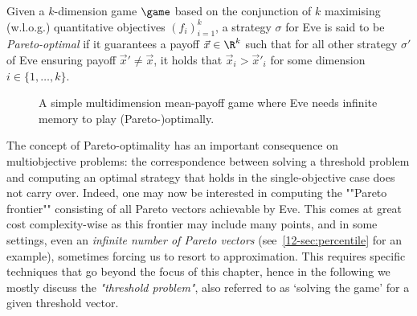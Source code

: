 \begin{definition}
Given a $k$-dimension game $\game$ based on the conjunction of $k$ maximising (w.l.o.g.) quantitative objectives $(f_i)_{i=1}^{k}$, a strategy $\sigma$ for Eve is said to be \emph{Pareto-optimal} if it guarantees a payoff $\vec{x} \in \R^k$ such that for all other strategy $\sigma'$ of Eve ensuring payoff $\vec{x}' \neq \vec{x}$, it holds that $\vec{x}_i > \vec{x}'_i$ for some dimension $i \in \{1, \ldots, k\}$.
\end{definition}
 
  
\begin{figure}[tbp]
  \centering
  \caption{A simple multidimension mean-payoff game where Eve needs infinite memory to play (Pareto-)optimally.}
  \label{12-fig:MultiMP}
\end{figure}

The concept of Pareto-optimality has an important consequence on multiobjective problems: the correspondence between solving a threshold problem and computing an optimal strategy that holds in the single-objective case does not carry over. Indeed, one may now be interested in computing the ""Pareto frontier"" consisting of all Pareto  vectors achievable by Eve. This comes at great cost complexity-wise as this frontier may include many points, and in some settings, even an \emph{infinite number of Pareto vectors} (see~\cref{12-sec:percentile} for an example),  sometimes forcing us to resort to approximation. This requires specific techniques that go beyond the focus of this chapter, hence in the following we mostly discuss the \emph{"threshold problem"}, also referred to as `solving the game' for a given threshold vector.

